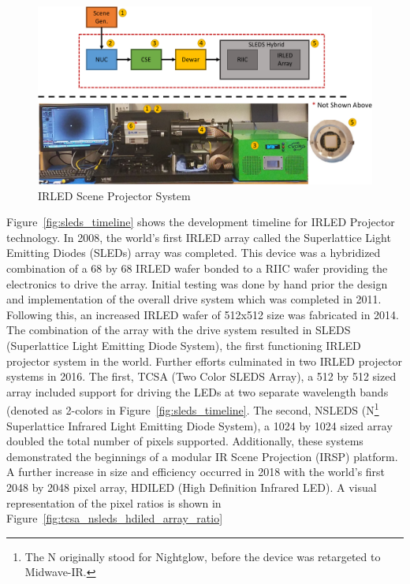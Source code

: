 \begin{figure}
    \centering
    \includegraphics[width=1.0\textwidth]{fig/sleds_system.pdf}
    \caption{IRLED Scene Projector System}
    \label{fig:sleds_system}
\end{figure}

Figure~\ref{fig:sleds_timeline} shows the development timeline for IRLED Projector technology. In 2008, the world's first IRLED array called the Superlattice Light Emitting Diodes (SLEDs) array was completed\cite{AhmedEtAl2019}. This device was a hybridized combination of a 68 by 68 IRLED wafer bonded to a RIIC wafer\cite{das2} providing the electronics to drive the array. Initial testing was done by hand prior the design and implementation of the overall drive system which was completed in 2011. Following this, an increased IRLED wafer of 512x512 size was fabricated in 2014\cite{norton1}. The combination of the array with the drive system resulted in SLEDS (Superlattice Light Emitting Diode System), the first functioning IRLED projector system in the world. Further efforts culminated in two IRLED projector systems in 2016. The first, TCSA (Two Color SLEDS Array), a 512 by 512 sized array\cite{McGeeEtAl2015, EjzakEtAl2016, EjzakEtAl2016_2, EjzakEtAl2017, RickerEtAl2017} included support for driving the LEDs at two separate wavelength bands (denoted as 2-colors in Figure~\ref{fig:sleds_timeline}. The second, NSLEDS (N\footnote{The N originally stood for Nightglow, before the device was retargeted to Midwave-IR.} Superlattice Infrared Light Emitting Diode System), a 1024 by 1024 sized array\cite{BenedictEtAl2017,AhmedEtAl2020} doubled the total number of pixels supported. Additionally, these systems demonstrated the beginnings of a modular IR Scene Projection (IRSP) platform\cite{BrowningEtAl2019}. A further increase in size and efficiency occurred in 2018 with the world's first 2048 by 2048 pixel array, HDILED (High Definition Infrared LED)\cite{BenedictEtAl2018}. A visual representation of the pixel ratios is shown in Figure~\ref{fig:tcsa_nsleds_hdiled_array_ratio}

